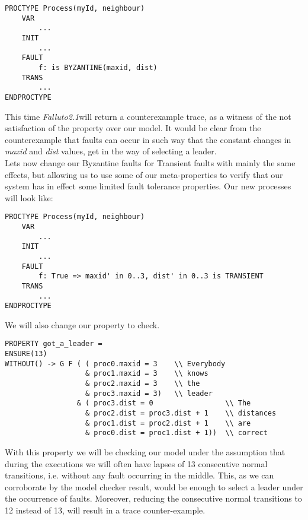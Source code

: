 \documentclass[12pt]{article}
\newcommand{\falluto}{\mbox{\textit{Falluto2.1}}}
\begin{document}
\begin{verbatim}
PROCTYPE Process(myId, neighbour)
    VAR
        ...
    INIT
        ...
    FAULT
        f: is BYZANTINE(maxid, dist)
    TRANS
        ...
ENDPROCTYPE
\end{verbatim}
This time \falluto will return a counterexample trace, as a witness of the not satisfaction of the property over our model. It would be clear from the counterexample that faults can occur in such way that the constant changes in \textit{maxid} and \textit{dist} values, get in the way of selecting a leader.\\
Lets now change our Byzantine faults for Transient faults with mainly the same effects, but allowing us to use some of our meta-properties to verify that our system has in effect some limited fault tolerance properties. Our new processes will look like:
 \begin{verbatim}
PROCTYPE Process(myId, neighbour)
    VAR
        ...
    INIT
        ...
    FAULT
        f: True => maxid' in 0..3, dist' in 0..3 is TRANSIENT
    TRANS
        ...
ENDPROCTYPE
\end{verbatim}
We will also change our property to check.
\begin{verbatim}
PROPERTY got_a_leader =
ENSURE(13)
WITHOUT() -> G F ( ( proc0.maxid = 3    \\ Everybody
                   & proc1.maxid = 3    \\ knows
                   & proc2.maxid = 3    \\ the
                   & proc3.maxid = 3)   \\ leader
                 & ( proc3.dist = 0                 \\ The
                   & proc2.dist = proc3.dist + 1    \\ distances
                   & proc1.dist = proc2.dist + 1    \\ are
                   & proc0.dist = proc1.dist + 1))  \\ correct
\end{verbatim}
With this property we will be checking our model under the assumption that during the executions we will often have lapses of 13 consecutive normal transitions, i.e. without any fault occurring in the middle. This, as we can corroborate by the model checker result, would be enough to select a leader under the occurrence of faults. Moreover, reducing the consecutive normal transitions to 12 instead of 13, will result in a trace counter-example.
\end{document}

